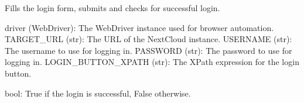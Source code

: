 \documentclass[letterpaper,10pt,english]{sphinxmanual}
\begin{document}

\begin{fulllineitems}
\label{\detokenize{utils:utils.authentication_management.login_to_nextcloud}}
\pysigstartsignatures
{}
\pysigstopsignatures
\sphinxAtStartPar
Fills the login form, submits and checks for successful login.
\begin{description}
\sphinxAtStartPar
driver (WebDriver): The WebDriver instance used for browser automation.
TARGET\_URL (str): The URL of the NextCloud instance.
USERNAME (str): The username to use for logging in.
PASSWORD (str): The password to use for logging in.
LOGIN\_BUTTON\_XPATH (str): The XPath expression for the login button.

\sphinxAtStartPar
bool: True if the login is successful, False otherwise.

\end{description}

\end{fulllineitems}


\begin{fulllineitems}
\label{\detokenize{utils:utils.authentication_management.orange_text}}
\pysigstartsignatures
{}
\pysigstopsignatures
\end{fulllineitems}

\end{document}
